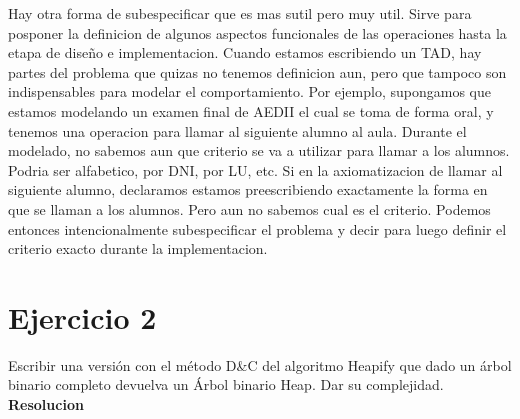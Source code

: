 \documentclass[10pt,a4paper]{article}
\begin{document}
\newline
\newline
Hay otra forma de subespecificar que es mas sutil pero muy util. Sirve para posponer la definicion de algunos aspectos funcionales de las operaciones hasta la etapa de diseño e implementacion. Cuando estamos escribiendo un TAD, hay partes del problema que quizas no tenemos definicion aun, pero que tampoco son indispensables para modelar el comportamiento.
\newline
\newline
Por ejemplo, supongamos que estamos modelando un examen final de AEDII el cual se toma de forma oral, y tenemos una operacion para llamar al siguiente alumno al aula. Durante el modelado, no sabemos aun que criterio se va a utilizar para llamar a los alumnos. Podria ser alfabetico, por DNI, por LU, etc. Si en la axiomatizacion de llamar al siguiente alumno, declaramos  estamos preescribiendo exactamente la forma en que se llaman a los alumnos. Pero aun no sabemos cual es el criterio. Podemos entonces intencionalmente subespecificar el problema y decir  para luego definir el criterio exacto durante la implementacion.
\newpage

\section{Ejercicio 2}

Escribir una versión con el método D\&C del algoritmo Heapify que dado un árbol binario completo devuelva un Árbol binario Heap. Dar su complejidad.
\newline
\newline
\textbf{Resolucion}
\end{document}
